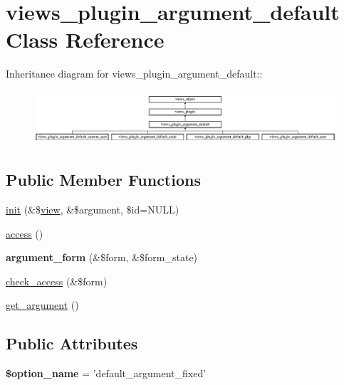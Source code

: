 \hypertarget{classviews__plugin__argument__default}{
\section{views\_\-plugin\_\-argument\_\-default Class Reference}
\label{classviews__plugin__argument__default}
}
Inheritance diagram for views\_\-plugin\_\-argument\_\-default::\begin{figure}[H]
\begin{center}
\leavevmode
\includegraphics[height=2.02166cm]{classviews__plugin__argument__default}
\end{center}
\end{figure}
\subsection*{Public Member Functions}
\begin{CompactItemize}
\item 
\hyperlink{classviews__plugin__argument__default_67fac77dc7005112a9ad05bcec9cc40e}{init} (\&\$\hyperlink{classview}{view}, \&\$argument, \$id=NULL)
\item 
\hyperlink{classviews__plugin__argument__default_47b0a69da2fb0e45c25aa9c8727f912f}{access} ()
\item 
\hypertarget{classviews__plugin__argument__default_2a9e4037b9f6c6b9928847aa3d29bf55}{
\textbf{argument\_\-form} (\&\$form, \&\$form\_\-state)}
\label{classviews__plugin__argument__default_2a9e4037b9f6c6b9928847aa3d29bf55}

\item 
\hyperlink{classviews__plugin__argument__default_80d65e0fc0a62ee3576d50875ffc7f22}{check\_\-access} (\&\$form)
\item 
\hyperlink{classviews__plugin__argument__default_8e67864f4a1ce20b12bc82afe1acd255}{get\_\-argument} ()
\end{CompactItemize}
\subsection*{Public Attributes}
\begin{CompactItemize}
\item 
\hypertarget{classviews__plugin__argument__default_0a67a9cc6817af7e38d335666122ed01}{
\textbf{\$option\_\-name} = 'default\_\-argument\_\-fixed'}
\label{classviews__plugin__argument__default_0a67a9cc6817af7e38d335666122ed01}

\end{CompactItemize}


